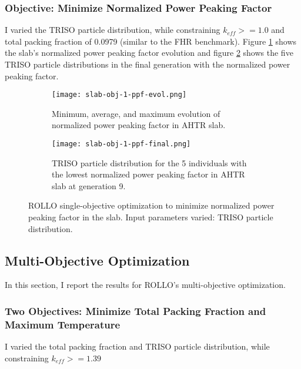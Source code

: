 \subsubsection{Objective: Minimize Normalized Power Peaking Factor}
I varied the TRISO particle distribution, while constraining $k_{eff} >= 1.0$ and 
total packing fraction of 0.0979 (similar to the FHR benchmark). 
Figure \ref{fig:slab-obj-1-ppf-evol} shows the slab's normalized power peaking 
factor evolution and figure \ref{fig:slab-obj-1-ppf-final} shows the five TRISO particle 
distributions in the final generation with the normalized power peaking factor. 
\begin{figure}[]
    \centering
    \begin{subfigure}{\textwidth}
        \texttt{[image: slab-obj-1-ppf-evol.png]}
        \caption{Minimum, average, and maximum evolution of normalized power 
        peaking factor in AHTR slab.}
        \label{fig:slab-obj-1-ppf-evol} 
    \end{subfigure}
    \begin{subfigure}{\textwidth}
        \texttt{[image: slab-obj-1-ppf-final.png]}
        \caption{TRISO particle distribution for the 5 individuals with the 
        lowest normalized power peaking factor in AHTR slab at generation 9.}
        \label{fig:slab-obj-1-ppf-final} 
    \end{subfigure}
    \caption{ROLLO single-objective optimization to minimize normalized power 
    peaking factor in the slab. Input parameters varied: TRISO particle distribution.}
    \label{fig:slab-obj-1-ppf}
\end{figure}

\subsection{Multi-Objective Optimization}
In this section, I report the results for ROLLO's multi-objective optimization. 

\subsubsection{Two Objectives: Minimize Total Packing Fraction and Maximum Temperature}
I varied the total packing fraction and TRISO particle distribution, while 
constraining $k_{eff} >= 1.39$